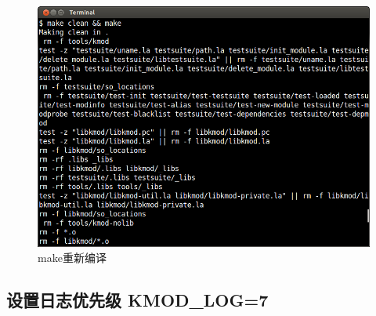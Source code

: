 \begin{figure}[htbp]
\centering
\includegraphics{./pictures/2-2-make.png}
\caption{make重新编译}
\end{figure}

\subsection{设置日志优先级 KMOD\_LOG=7}

